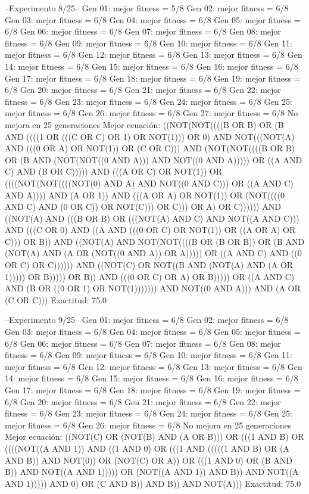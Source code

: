 --Experimento 
 8/25--
Gen 01: mejor fitness = 5/8
Gen 02: mejor fitness = 6/8
Gen 03: mejor fitness = 6/8
Gen 04: mejor fitness = 6/8
Gen 05: mejor fitness = 6/8
Gen 06: mejor fitness = 6/8
Gen 07: mejor fitness = 6/8
Gen 08: mejor fitness = 6/8
Gen 09: mejor fitness = 6/8
Gen 10: mejor fitness = 6/8
Gen 11: mejor fitness = 6/8
Gen 12: mejor fitness = 6/8
Gen 13: mejor fitness = 6/8
Gen 14: mejor fitness = 6/8
Gen 15: mejor fitness = 6/8
Gen 16: mejor fitness = 6/8
Gen 17: mejor fitness = 6/8
Gen 18: mejor fitness = 6/8
Gen 19: mejor fitness = 6/8
Gen 20: mejor fitness = 6/8
Gen 21: mejor fitness = 6/8
Gen 22: mejor fitness = 6/8
Gen 23: mejor fitness = 6/8
Gen 24: mejor fitness = 6/8
Gen 25: mejor fitness = 6/8
Gen 26: mejor fitness = 6/8
Gen 27: mejor fitness = 6/8
No mejora en 25 generaciones
Mejor ecuación: ((NOT(NOT((((B OR B) OR (B AND ((((1 OR (((C OR C) OR 1) OR NOT(1))) OR 0) AND NOT(((NOT(A) AND (((0 OR A) OR NOT(1)) OR (C OR C))) AND (NOT(NOT((((B OR B) OR (B AND (NOT(NOT((0 AND A))) AND NOT((0 AND A))))) OR ((A AND C) AND (B OR C))))) AND (((A OR C) OR NOT(1)) OR ((((NOT(NOT((((NOT(0) AND A) AND NOT((0 AND C))) OR ((A AND C) AND A)))) AND (A OR 1)) AND (((A OR A) OR NOT(1)) OR (NOT((((0 AND C) AND (0 OR C)) OR NOT(C))) OR C))) OR A) OR C)))))) AND ((NOT(A) AND (((B OR B) OR (((NOT(A) AND C) AND NOT((A AND C))) AND (((C OR 0) AND ((A AND (((0 OR C) OR NOT(1)) OR ((A OR A) OR C))) OR B)) AND ((NOT(A) AND NOT(NOT((((B OR (B OR B)) OR (B AND (NOT(A) AND (A OR (NOT((0 AND A)) OR A))))) OR ((A AND C) AND ((0 OR C) OR C)))))) AND ((NOT(C) OR NOT((B AND (NOT(A) AND (A OR 1))))) OR B))))) OR B)) AND (((0 OR C) OR A) OR B))))) OR ((A AND C) AND (B OR ((0 OR 1) OR NOT(1))))))) AND NOT((0 AND A))) AND (A OR (C OR C)))
 Exactitud: 75.0%

--Experimento 
 9/25--
Gen 01: mejor fitness = 6/8
Gen 02: mejor fitness = 6/8
Gen 03: mejor fitness = 6/8
Gen 04: mejor fitness = 6/8
Gen 05: mejor fitness = 6/8
Gen 06: mejor fitness = 6/8
Gen 07: mejor fitness = 6/8
Gen 08: mejor fitness = 6/8
Gen 09: mejor fitness = 6/8
Gen 10: mejor fitness = 6/8
Gen 11: mejor fitness = 6/8
Gen 12: mejor fitness = 6/8
Gen 13: mejor fitness = 6/8
Gen 14: mejor fitness = 6/8
Gen 15: mejor fitness = 6/8
Gen 16: mejor fitness = 6/8
Gen 17: mejor fitness = 6/8
Gen 18: mejor fitness = 6/8
Gen 19: mejor fitness = 6/8
Gen 20: mejor fitness = 6/8
Gen 21: mejor fitness = 6/8
Gen 22: mejor fitness = 6/8
Gen 23: mejor fitness = 6/8
Gen 24: mejor fitness = 6/8
Gen 25: mejor fitness = 6/8
Gen 26: mejor fitness = 6/8
No mejora en 25 generaciones
Mejor ecuación: ((NOT(C) OR (NOT(B) AND (A OR B))) OR (((1 AND B) OR ((((NOT((A AND 1)) AND ((1 AND 0) OR (((1 AND (((((1 AND B) OR (A AND B)) AND NOT(0)) OR (NOT(C) OR A)) OR (((1 AND 0) OR (B AND B)) AND NOT((A AND 1))))) OR (NOT((A AND 1)) AND B)) AND NOT((A AND 1))))) AND 0) OR (C AND B)) AND B)) AND NOT(A)))
 Exactitud: 75.0%

